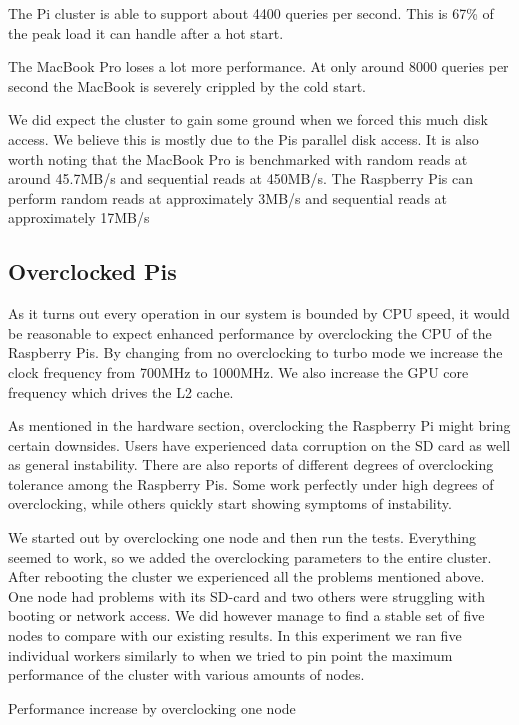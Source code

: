 The Pi cluster is able to support about 4400 queries per second. This is 67\% of the peak load it can handle after a hot start.

The MacBook Pro loses a lot more performance. At only around 8000 queries per second the MacBook is severely crippled by the cold start.


We did expect the cluster to gain some ground when we forced this much disk access. We believe this is mostly due to the Pis parallel disk access. It is also worth noting that the MacBook Pro is benchmarked with random reads at around 45.7MB/s and sequential reads at 450MB/s. The Raspberry Pis can perform random reads at approximately 3MB/s and sequential reads at approximately 17MB/s



\subsection{Overclocked Pis}
As it turns out every operation in our system is bounded by CPU speed, it would be reasonable to expect enhanced performance by overclocking the CPU of the Raspberry Pis.
By changing from no overclocking to turbo mode we increase the clock frequency from 700MHz to 1000MHz. We also increase the GPU core frequency which drives the L2 cache.

As mentioned in the hardware section, overclocking the Raspberry Pi might bring certain downsides. Users have experienced data corruption on the SD card as well as general instability. There are also reports of different degrees of overclocking tolerance among the Raspberry Pis. Some work perfectly under high degrees of overclocking, while others quickly start showing symptoms of instability.

We started out by overclocking one node and then run the tests. Everything seemed to work, so we added the overclocking parameters to the entire cluster. After rebooting the cluster we experienced all the problems mentioned above. One node had problems with its SD-card and two others were struggling with booting or network access. We did however manage to find a stable set of five nodes to compare with our existing results. In this experiment we ran five individual workers similarly to when we tried to pin point the maximum performance of the cluster with various amounts of nodes.

\begin{table}[h]
	\oconecore
	\centering

	\pgfplotstabletypeset[
     	columns={request, clock, gain},
     	every head row/.style={after row=\hline},
		every last row/.style={after row=\hline},
		columns/request/.style={column name=Queries per second},
		columns/clock/.style={column name=Clock(MHz)},
		columns/gain/.style={column name=Gain(\%)},
     	]
    {\oconecore}
    \caption{Performance increase by overclocking one node}
\label{tab:oconecore}
\end{table}

